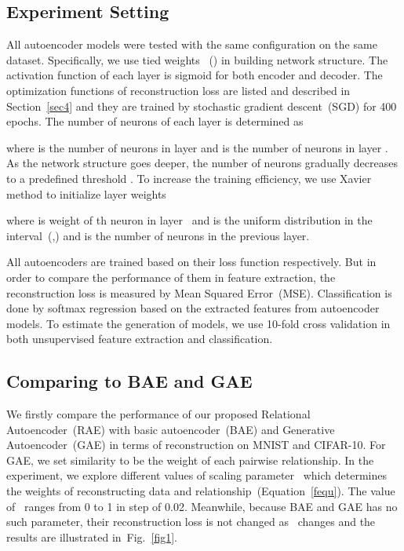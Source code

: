 \documentclass[conference]{IEEEtran}
\begin{document}
	\begin{figure*}[!t]
		\centering
		\caption{The comparative results of reconstruction loss on the MNIST and CIFAR-10 dataset among Relational Autoencoder~(RAE), basic autoencoder~(BAE) and Generative Autoencoder~(GAE). It describes how information loss changes as the scale parameter  changes.}
		\label{fig1}
	\end{figure*}
	
	\subsection{Experiment Setting}
	All autoencoder models were tested with the same configuration on the same dataset. Specifically, we use tied weights ~() in building network structure. The activation function of each layer is sigmoid for both encoder and decoder. The optimization functions of reconstruction loss are listed and described in Section~\ref{sec4} and they are trained by stochastic gradient descent~(SGD) for 400 epochs. The number of neurons of each layer is determined as
	
	where  is the number of neurons in layer  and  is the number of neurons in layer . As the network structure goes deeper, the number of neurons gradually decreases  to a predefined threshold . To increase the training efficiency, we use Xavier~\cite{glorot2010understanding} method to initialize layer weights
	
	where  is weight of th neuron in layer~  and  is the uniform distribution in the interval~(,) and  is the number of neurons in the previous layer.
	
	All autoencoders are trained based on their loss function respectively. But in order to compare the performance of them in feature extraction, the reconstruction loss is measured by Mean Squared Error~(MSE). Classification is done by softmax regression based on the extracted features from autoencoder models. To estimate the generation of models, we use 10-fold cross validation in both unsupervised feature extraction and classification.

	\subsection{Comparing to BAE and GAE}
	We firstly compare the performance of our proposed Relational Autoencoder~(RAE) with basic autoencoder~(BAE) and Generative Autoencoder~(GAE) in terms of reconstruction on MNIST and CIFAR-10. For GAE, we set similarity to be the weight of each pairwise relationship. In the experiment, we explore different values of scaling parameter~ which determines the weights of reconstructing data and relationship~(Equation~\ref{fequ}). The value of~ ranges from 0 to 1 in step of 0.02. Meanwhile, because BAE and GAE has no such parameter, their reconstruction loss is not changed as~ changes and the results are illustrated in~Fig.~\ref{fig1}.
	
\end{document}
